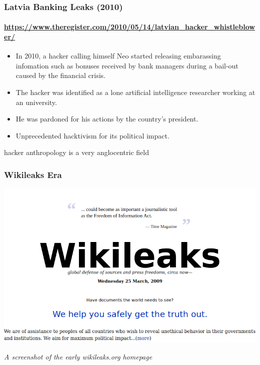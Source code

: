 \documentclass[aspectratio=169,usenames,dvipsnames]{beamer}
\begin{document}
\begin{frame}
  \frametitle{Latvia Banking Leaks (2010)}
  \framesubtitle{\url{https://www.theregister.com/2010/05/14/latvian_hacker_whistleblower/}}

  \begin{itemize}[<+->]
    \item In 2010, a hacker calling himself Neo started releasing embarassing
      infomation such as bonuses received by bank managers during a bail-out
      caused by the financial crisis.
    \item The hacker was identified as a lone artificial intelligence
      researcher working at an university.
    \item He was pardoned for his actions by the country's president.
    \item Unprecedented hacktivism for its political impact.
  \end{itemize}

\end{frame}
\begin{frame}[c]

  \centering

  hacker anthropology is a very anglocentric field

\end{frame}

\begin{frame}[c]
  \frametitle{Wikileaks Era}

  \centering

  \includegraphics[width=\textwidth,height=0.5\textheight,keepaspectratio]{img/wikileaks.png}

  \vspace{5mm}

  \footnotesize
  \emph{A screenshot of the early wikileaks.org homepage}
\end{frame}
\end{document}
